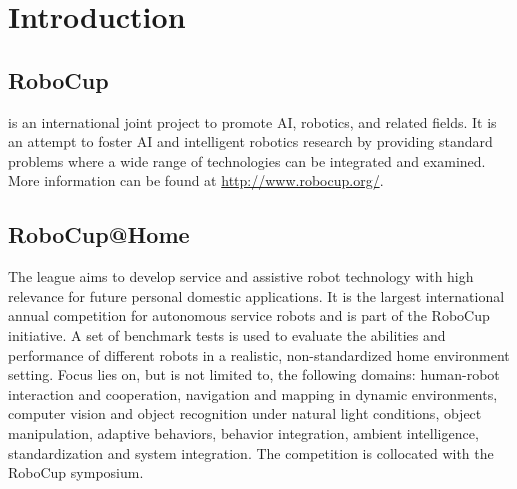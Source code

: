 \chapter{Introduction}
\label{chap:introduction}


\section{RoboCup}

 is an international joint project to promote AI, robotics, and related fields.
It is an attempt to foster AI and intelligent robotics research by providing standard problems where a wide range of technologies can be integrated and examined. More information can be found at \url{http://www.robocup.org/}.

\section{RoboCup@Home}

The  league aims to develop service and assistive robot technology with high relevance for future personal domestic applications.
It is the largest international annual competition for autonomous service robots and is part of the RoboCup initiative.
A set of benchmark tests is used to evaluate the abilities and performance of different robots in a realistic, non-standardized home environment setting.
Focus lies on, but is not limited to, the following domains: human-robot interaction and cooperation, navigation and mapping in dynamic environments, computer vision and object recognition under natural light conditions, object manipulation, adaptive behaviors, behavior integration, ambient intelligence, standardization and system integration.
The competition is collocated with the RoboCup symposium.











